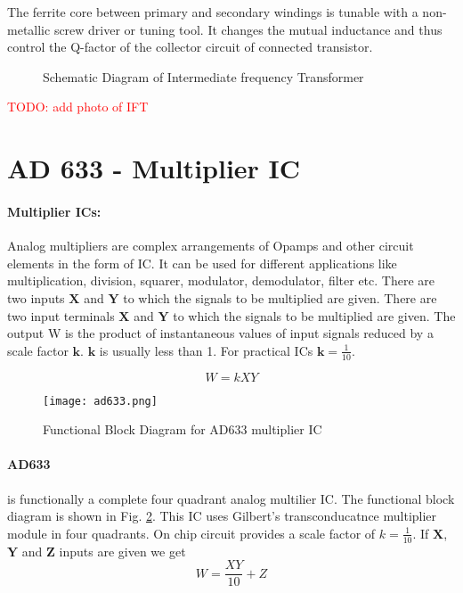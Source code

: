 The ferrite core between primary and secondary windings is tunable with a non-metallic screw driver or tuning tool. It changes the mutual inductance and thus control the Q-factor of the collector circuit of connected transistor\cite{Tomasi}.
 
\begin{figure}
\caption {Schematic Diagram of Intermediate frequency Transformer}
\label{iftschem}
\end{figure}

\textcolor{red}{TODO: add photo of IFT}


\section{AD 633 - Multiplier IC}
\label{AD633}
\paragraph{Multiplier ICs:}
 Analog multipliers are complex arrangements of Opamps and other circuit elements in the form of IC. It can be used for different applications like multiplication, division, squarer, modulator, demodulator, filter etc. There are two inputs $\textbf{X}$ and $\textbf{Y}$ to which the signals to be multiplied are given.
There are two input terminals $\textbf{X}$ and $\textbf{Y}$ to which the signals to be multiplied are given. The output W is the product of instantaneous values of input signals reduced by a scale factor $\textbf{k}$. $\textbf{k}$ is usually less than 1. For practical ICs $\textbf{k}=\frac{1}{10}$.

\begin{equation}
W=kXY
\end{equation}

\begin{figure}[h]
\texttt{[image: ad633.png]}
\caption{Functional Block Diagram for AD633 multiplier IC}
\label{ad633}
\end{figure}

\paragraph{AD633} is functionally a complete four quadrant analog multilier IC. The functional block diagram is shown in Fig. \ref{ad633}. This IC uses Gilbert's transconducatnce multiplier module in four quadrants. On chip circuit provides a scale factor of $k=\frac{1}{10}$. If $\textbf{X}$, $\textbf{Y}$ and $\textbf{Z}$ inputs are given we get 
\begin{equation}
W=\frac{XY}{10}+Z
\end{equation}

